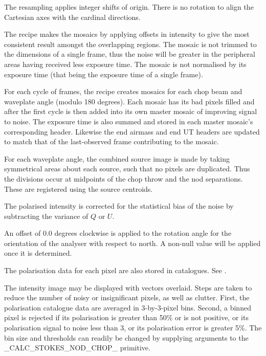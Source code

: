 \documentclass[twoside,11pt,nolof]{starlink}
\begin{document}
{{{         \sstitem
         The resampling applies integer shifts of origin.  There is no
         rotation to align the Cartesian axes with the cardinal directions.

         \sstitem
         The recipe makes the mosaics by applying offsets in intensity
         to give the most consistent result amongst the overlapping regions.
         The mosaic is not trimmed to the dimensions of a single frame, thus
         the noise will be greater in the peripheral areas having received
         less exposure time.  The mosaic is not normalised by its exposure
         time (that being the exposure time of a single frame).

         \sstitem
         For each cycle of frames, the recipe creates mosaics for each
         chop beam and waveplate angle (modulo 180 degrees).  Each mosaic
         has its bad pixels filled and after the first cycle is then added
         into its own master mosaic of improving signal to noise.  The
         exposure time is also summed and stored in each master mosaic's
         corresponding header.  Likewise the end airmass and end UT headers
         are updated to match that of the last-observed frame contributing
         to the mosaic.

         \sstitem
         For each waveplate angle, the combined source image is made by
         taking symmetrical areas about each source, such that no pixels
         are duplicated.  Thus the divisions occur at midpoints of the chop
         throw and the nod separations.  These are registered using the
         source centroids.

         \sstitem
         The polarised intensity is corrected for the statistical bias
         of the noise by subtracting the variance of $Q$ or $U$.

         \sstitem
         An offset of 0.0 degrees clockwise is applied to the rotation
         angle for the orientation of the analyser with respect to north.
         A non-null value will be applied once it is determined.

         \sstitem
         The polarisation data for each pixel are also stored in
         catalogues.  See .

         \sstitem
         The intensity image may be displayed with vectors overlaid.
         Steps are taken to reduce the number of noisy or insignificant
         pixels, as well as clutter.  First, the polarisation catalogue data
         are averaged in 3-by-3-pixel bins.  Second, a binned pixel is
         rejected if its polarisation is greater than 50\% or is not positive,
         or its polarisation signal to noise less than 3, or its polarisation
         error is greater 5\%.  The bin size and thresholds can readily be
         changed by supplying arguments to the \_CALC\_STOKES\_NOD\_CHOP\_
         primitive.

}}}
\end{document}

